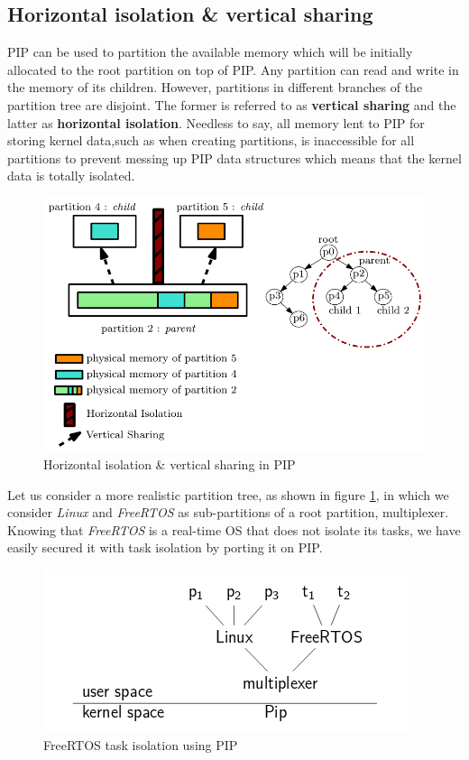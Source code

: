 \subsection{Horizontal isolation \& vertical sharing} \label{properties}

PIP can be used to partition the available memory which will be initially allocated to the root partition on top of PIP. Any partition can read and write in the memory of its children. However, partitions in different branches of the partition tree are disjoint. The former is referred to as \textbf{vertical sharing} and the latter as \textbf{horizontal isolation}. Needless to say, all memory lent to PIP for storing kernel data,such as when creating partitions, is inaccessible for all partitions to prevent messing up PIP data structures which means that the kernel data is totally isolated.
   
\begin{figure}[!ht]
	\centering 
	\includegraphics[width=0.8\linewidth,frame]{img/memoryIsolShare.png} 
	\caption{Horizontal isolation \& vertical sharing in PIP}
\end{figure}

\noindent Let us consider a more realistic partition tree, as shown in figure \ref{FreeRTOS}, in which we consider \textit{Linux} and \textit{FreeRTOS} as sub-partitions of a root partition, multiplexer. Knowing that \textit{FreeRTOS} is a real-time OS that does not isolate its tasks, we have easily secured it with task isolation by porting it on PIP.

\begin{figure}[!ht] \label{FreeRTOS}
	\centering 
	\includegraphics[scale=0.5,frame]{img/FreeRTOSEx.png} 
	\caption{FreeRTOS task isolation using PIP}
\end{figure}

